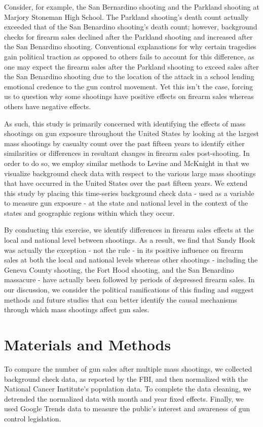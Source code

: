 \documentclass[9pt,twocolumn,twoside,lineno]{pnas-new}
\begin{document}
Consider, for example, the San Bernardino shooting and the Parkland shooting at Marjory Stoneman High School. The Parkland shooting's death count actually exceeded that of the San Benardino shooting's death count; however, background checks for firearm sales declined after the Parkland shooting and increased after the San Benardino shooting. Conventional explanations for why certain tragedies gain political traction as opposed to others fails to account for this difference, as one may expect the firearm sales after the Parkland shooting to exceed sales after the San Benardino shooting due to the location of the attack in a school lending emotional credence to the gun control movement. Yet this isn't the case, forcing us to question why some shootings have positive effects on firearm sales whereas others have negative effects. 

As such, this study is primarily concerned with identifying the effects of mass shootings on gun exposure throughout the United States by looking at the largest mass shootings by casualty count over the past fifteen years to identify either similarities or differences in resultant changes in firearm sales post-shooting. In order to do so, we employ similar methods to Levine and McKnight in that we visualize background check data with respect to the various large mass shootings that have occurred in the United States over the past fifteen years. We extend this study by placing this time-series background check data - used as a variable to measure gun exposure - at the state and national level in the context of the states and geographic regions within which they occur. 

By conducting this exercise, we identify differences in firearm sales effects at the local and national level between shootings. As a result, we find that Sandy Hook was actually the exception - not the rule - in its positive influence on firearm sales at both the local and national levels whereas other shootings - including the Geneva County shooting, the Fort Hood shooting, and the San Benardino massacure - have actually been followed by periods of depressed firearm sales. In our discussion, we consider the political ramifications of this finding and suggest methods and future studies that can better identify the causal mechanisms through which mass shootings affect gun sales. 
\section{Materials and Methods}
To compare the number of gun sales after multiple mass shootings, we collected background check data, as reported by the FBI, and then normalized with the National Cancer Institute's population data. To complete the data cleaning, we detrended the normalized data with month and year fixed effects. Finally, we used Google Trends data to measure the public's interest and awareness of gun control legislation. 
\end{document}

